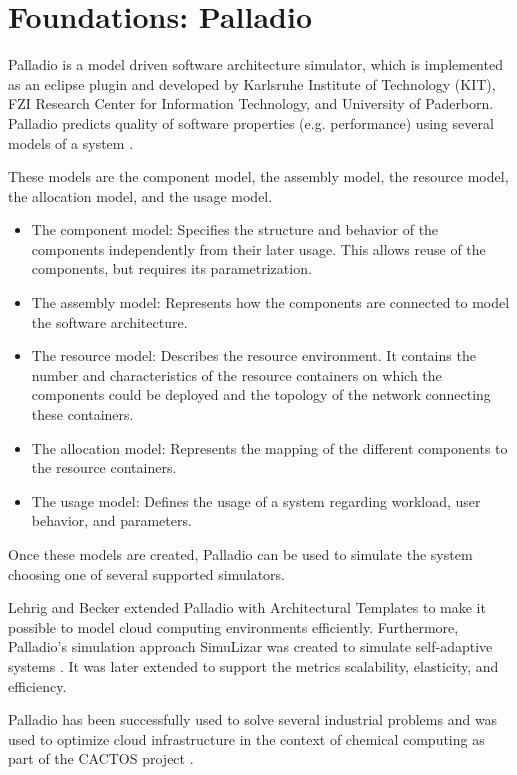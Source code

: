 \documentclass{webofc}
\begin{document}
\section{Foundations: Palladio}
\label{sec:palladio}
Palladio is a model driven software architecture simulator, which is implemented as an eclipse plugin and developed by Karlsruhe Institute of Technology (KIT), FZI Research Center for Information Technology, and University of Paderborn. Palladio predicts quality of software properties (e.g. performance) using several models of a system \cite{BECKER20093}.

These models are the component model, the assembly model, the resource model, the allocation model, and the usage model.
\begin{itemize}
	\item The component model: Specifies the structure and behavior of the components independently from their later usage. This allows reuse of the components, but requires its parametrization.
	\item The assembly model: Represents how the components are connected to model the software architecture.
	\item The resource model: Describes the resource environment. It contains the number and characteristics of the resource containers on which the components could be deployed and the topology of the network connecting these containers.
	\item The allocation model: Represents the mapping of the different components to the resource containers.
	\item The usage model: Defines the usage of a system regarding workload, user behavior, and parameters.
	
\end{itemize}
Once these models are created, Palladio can be used to simulate the system choosing one of several supported simulators. 

Lehrig and Becker \cite{arch} extended Palladio with Architectural Templates to make it possible to model cloud computing environments efficiently.
Furthermore, Palladio's simulation approach SimuLizar was created to simulate self-adaptive systems \cite{becker2013simulizar}.
It was later extended to support the metrics scalability, elasticity, and efficiency.

Palladio has been successfully used to solve several industrial problems and was used to optimize cloud infrastructure in the context of chemical computing as part of the CACTOS project \cite{rapidtesting}. 
\end{document}
